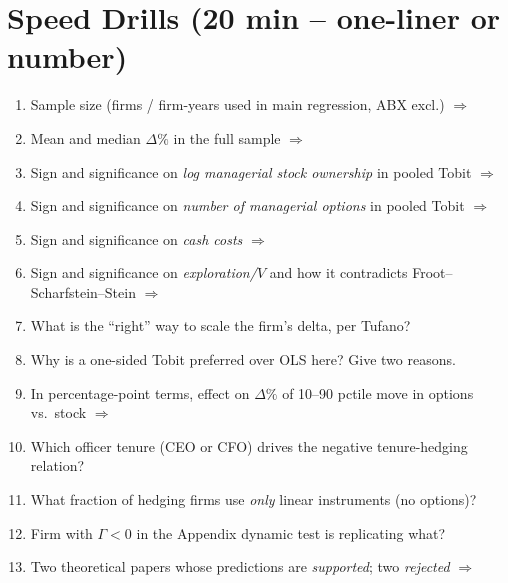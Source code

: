 \documentclass[11pt]{article}
\newcommand{\dP}{\Delta\%}
\begin{document}
\section*{Speed Drills (20 min -- one-liner or number)}
\begin{drillbox}
\begin{enumerate}
\item Sample size (firms / firm-years used in main regression, ABX excl.) $\Rightarrow$ \\[1.5em]
\item Mean and median $\dP$ in the full sample $\Rightarrow$ \\[1.5em]
\item Sign and significance on \emph{log managerial stock ownership} in pooled Tobit $\Rightarrow$ \\[1.5em]
\item Sign and significance on \emph{number of managerial options} in pooled Tobit $\Rightarrow$ \\[1.5em]
\item Sign and significance on \emph{cash costs} $\Rightarrow$ \\[1.5em]
\item Sign and significance on \emph{exploration/$V$} and how it contradicts Froot--Scharfstein--Stein $\Rightarrow$ \\[1.5em]
\item What is the ``right'' way to scale the firm's delta, per Tufano? \\[1.5em]
\item Why is a one-sided Tobit preferred over OLS here? Give two reasons. \\[1.5em]
\item In percentage-point terms, effect on $\dP$ of 10--90 pctile move in options vs.\ stock $\Rightarrow$ \\[1.5em]
\item Which officer tenure (CEO or CFO) drives the negative tenure-hedging relation? \\[1.5em]
\item What fraction of hedging firms use \emph{only} linear instruments (no options)? \\[1.5em]
\item Firm with $\Gamma < 0$ in the Appendix dynamic test is replicating what? \\[1.5em]
\item Two theoretical papers whose predictions are \emph{supported}; two \emph{rejected} $\Rightarrow$ \\[1.5em]

\end{enumerate}
\end{drillbox}
\end{document}
